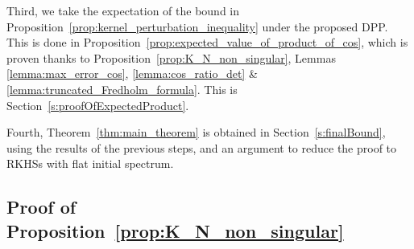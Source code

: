 \documentclass[twoside,11pt]{book}
\begin{document}
Third, we take the expectation of the bound in Proposition~\ref{prop:kernel_perturbation_inequality} under the proposed DPP. This is done in Proposition~\ref{prop:expected_value_of_product_of_cos}, which is proven thanks to Proposition~\ref{prop:K_N_non_singular}, Lemmas \ref{lemma:max_error_cos}, \ref{lemma:cos_ratio_det} \& \ref{lemma:truncated_Fredholm_formula}. This is Section~\ref{s:proofOfExpectedProduct}.

Fourth, Theorem~\ref{thm:main_theorem} is obtained in Section~\ref{s:finalBound}, using the results of the previous steps, and an argument to reduce the proof to RKHSs with flat initial spectrum.

\subsection{Proof of Proposition~\ref{prop:K_N_non_singular}}\label{app:K_N_non_singular}
\end{document}
